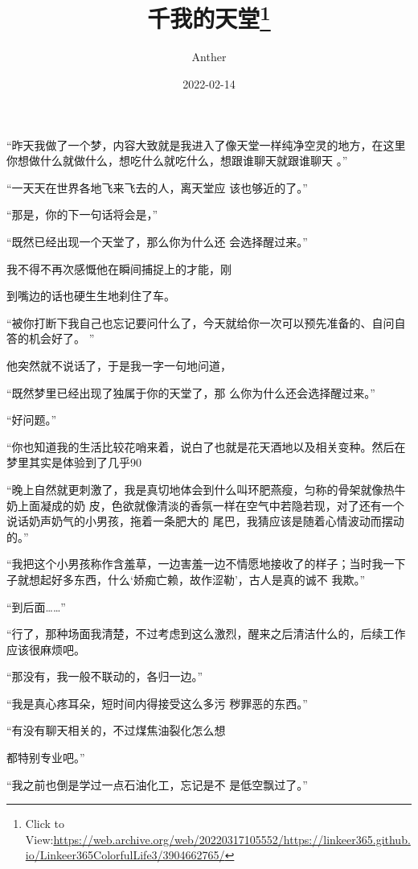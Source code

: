 \documentclass{article}
\title{千我的天堂\footnote{Click to View:\url{https://web.archive.org/web/20220317105552/https://linkeer365.github.io/Linkeer365ColorfulLife3/3904662765/}}}
\author{Anther}
\date{2022-02-14}
\begin{document}

\maketitle


\Large

﻿“昨天我做了一个梦，内容大致就是我进入了像天堂一样纯净空灵的地方，在这里你想做什么就做什么，想吃什么就吃什么，想跟谁聊天就跟谁聊天
。” 

“一天天在世界各地飞来飞去的人，离天堂应
该也够近的了。” 


“那是，你的下一句话将会是，” 

“既然已经出现一个天堂了，那么你为什么还
会选择醒过来。” 

我不得不再次感慨他在瞬间捕捉上的才能，刚

\newpage
到嘴边的话也硬生生地刹住了车。 

“被你打断下我自己也忘记要问什么了，今天就给你一次可以预先准备的、自问自答的机会好了。
” 

他突然就不说话了，于是我一字一句地问道，
 

“既然梦里已经出现了独属于你的天堂了，那
么你为什么还会选择醒过来。” 


“好问题。” 

“你也知道我的生活比较花哨来着，说白了也就是花天酒地以及相关变种。然后在梦里其实是体验到了几乎90%

“晚上自然就更刺激了，我是真切地体会到什么叫环肥燕瘦，匀称的骨架就像热牛奶上面凝成的奶
\newpage
皮，色欲就像清淡的香氛一样在空气中若隐若现，对了还有一个说话奶声奶气的小男孩，拖着一条肥大的
尾巴，我猜应该是随着心情波动而摆动的。” 

“我把这个小男孩称作含羞草，一边害羞一边不情愿地接收了的样子；当时我一下子就想起好多东西，什么‘娇痴亡赖，故作涩勒’，古人是真的诚不
我欺。” 


“到后面……” 

“行了，那种场面我清楚，不过考虑到这么激烈，醒来之后清洁什么的，后续工作应该很麻烦吧。


“那没有，我一般不联动的，各归一边。” 

“我是真心疼耳朵，短时间内得接受这么多污
秽罪恶的东西。” 

“有没有聊天相关的，不过煤焦油裂化怎么想

\newpage
都特别专业吧。” 

“我之前也倒是学过一点石油化工，忘记是不
是低空飘过了。” 
\end{document}
